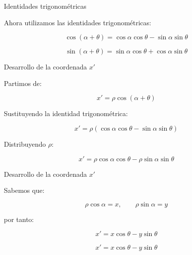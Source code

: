 \documentclass[aspectratio=169]{beamer}
\begin{document}
\begin{frame}{Identidades trigonométricas}

    Ahora utilizamos las identidades trigonométricas:

    \[
    \cos(\alpha+\theta)
    =
    \cos\alpha\cos\theta
    -
    \sin\alpha\sin\theta
    \]

    \[
    \sin(\alpha+\theta)
    =
    \sin\alpha\cos\theta
    +
    \cos\alpha\sin\theta
    \]

    \vspace{0.3cm}


\end{frame}

\begin{frame}{Desarrollo de la coordenada \texorpdfstring{$x'$}{x'}}

    Partimos de:

    \[
    x'=\rho\cos(\alpha+\theta)
    \]

    Sustituyendo la identidad trigonométrica:

    \[
    x'
    =
    \rho
    \left(
    \cos\alpha\cos\theta
    -
    \sin\alpha\sin\theta
    \right)
    \]

    Distribuyendo $\rho$:

    \[
    x'
    =
    \rho\cos\alpha\cos\theta
    -
    \rho\sin\alpha\sin\theta
    \]

\end{frame}

\begin{frame}{Desarrollo de la coordenada \texorpdfstring{$x'$}{x'}}

    Sabemos que:

    \[
    \rho\cos\alpha=x,
    \qquad
    \rho\sin\alpha=y
    \]

    por tanto:

    \[
    x'
    =
    x\cos\theta
    -
    y\sin\theta
    \]

    \[
    \boxed{
        x'=x\cos\theta-y\sin\theta
    }
    \]

\end{frame}
\end{document}
